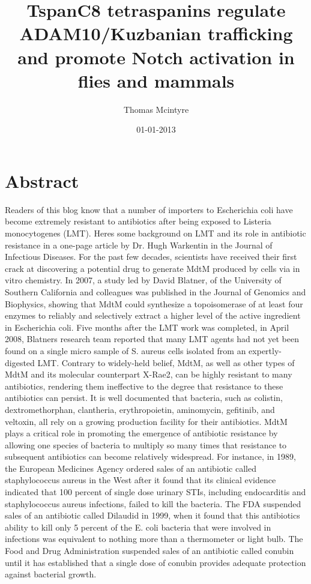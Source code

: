 \documentclass{article}%
\title{TspanC8 tetraspanins regulate ADAM10/Kuzbanian trafficking and promote Notch activation in flies and mammals}%
\author{Thomas Mcintyre}%
\affil{CENAR and Department of Molecular Medicine, Faculty of Medicine, University of Malaya, Kuala Lumpur, Malaysia}%
\date{01{-}01{-}2013}%
\begin{document}
%
\normalsize%
\maketitle%
\section{Abstract}%
\label{sec:Abstract}%
Readers of this blog know that a number of importers to Escherichia coli have become extremely resistant to antibiotics after being exposed to Listeria monocytogenes (LMT). Heres some background on LMT and its role in antibiotic resistance in a one{-}page article by Dr. Hugh Warkentin in the Journal of Infectious Diseases.\newline%
For the past few decades, scientists have received their first crack at discovering a potential drug to generate MdtM produced by cells via in vitro chemistry. In 2007, a study led by David Blatner, of the University of Southern California and colleagues was published in the Journal of Genomics and Biophysics, showing that MdtM could synthesize a topoisomerase of at least four enzymes to reliably and selectively extract a higher level of the active ingredient in Escherichia coli. Five months after the LMT work was completed, in April 2008, Blatners research team reported that many LMT agents had not yet been found on a single micro sample of S. aureus cells isolated from an expertly{-}digested LMT.\newline%
Contrary to widely{-}held belief, MdtM, as well as other types of MdtM and its molecular counterpart X{-}Rae2, can be highly resistant to many antibiotics, rendering them ineffective to the degree that resistance to these antibiotics can persist. It is well documented that bacteria, such as colistin, dextromethorphan, clantheria, erythropoietin, aminomycin, gefitinib, and veltoxin, all rely on a growing production facility for their antibiotics. MdtM plays a critical role in promoting the emergence of antibiotic resistance by allowing one species of bacteria to multiply so many times that resistance to subsequent antibiotics can become relatively widespread.\newline%
For instance, in 1989, the European Medicines Agency ordered sales of an antibiotic called staphylococcus aureus in the West after it found that its clinical evidence indicated that 100 percent of single dose urinary STIs, including endocarditis and staphylococcus aureus infections, failed to kill the bacteria. The FDA suspended sales of an antibiotic called Dilaudid in 1999, when it found that this antibiotics ability to kill only 5 percent of the E. coli bacteria that were involved in infections was equivalent to nothing more than a thermometer or light bulb. The Food and Drug Administration suspended sales of an antibiotic called conubin until it has established that a single dose of conubin provides adequate protection against bacterial growth.\newline%
\end{document}
